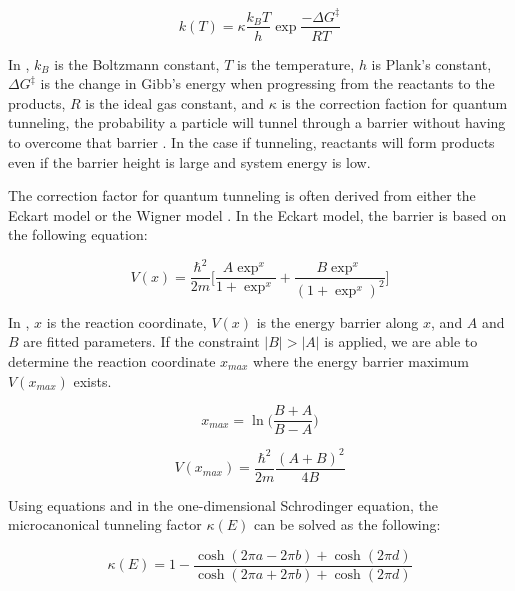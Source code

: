 \documentclass[preprint, 11pt]{elsarticle} %
\begin{document}
\begin{equation}
    k(T) = \kappa \frac{k_B T}{h} \exp{\frac{-\Delta G^\ddagger}{RT}}
    \label{eyring:1}
\end{equation}

In , $k_B$ is the Boltzmann constant, $T$ is the temperature, $h$ is Plank's constant, $\Delta G^\ddagger$ is the change in Gibb's energy when progressing from the reactants to the products,  $R$ is the ideal gas constant, and $\kappa$ is the correction faction for quantum tunneling, the probability a particle will tunnel through a barrier without having to overcome that barrier \cite{RUBAKOV:1984}.
In the case if tunneling, reactants will form products even if the barrier height is large and system energy is low. 

The correction factor for quantum tunneling is often derived from either the Eckart model \cite{eckart:1930} or the Wigner model \cite{Winger:1932}.
In the Eckart model, the barrier is based on the following equation:

\begin{equation}
    V(x) = \frac{\hbar^2}{2m}\Big[ \frac{A\exp^x}{1+\exp^x} + \frac{B\exp^x}{(1+\exp^x)^2} \Big]
    \label{eq:v_tunnel}
\end{equation}


In , $x$ is the reaction coordinate, $V(x)$ is the energy barrier along $x$, and $A$ and $B$ are fitted parameters.
If the constraint $|B| > |A|$ is applied, we are able to determine the reaction coordinate $x_{max}$ where the energy barrier maximum $V(x_{max})$ exists.

\begin{equation}
    x_{max} = \ln \Bigg(\frac{B+A}{B-A} \Bigg)
    \label{eq:xmax}
\end{equation}

\begin{equation}
    V(x_{max}) = \frac{\hbar^2}{2m} \frac{(A+B)^2}{4B}
    \label{eq:vmax}
\end{equation}

Using equations  and  in the one-dimensional Schrodinger equation, the microcanonical tunneling factor $\kappa(E)$ can be solved as the following:

\begin{equation}
    \kappa(E) = 1 - \frac{\cosh(2\pi a - 2\pi b) + \cosh(2\pi d)}{\cosh(2\pi a + 2\pi b) + \cosh(2\pi d)}
    \label{eq:kappae}
\end{equation}
\end{document}
